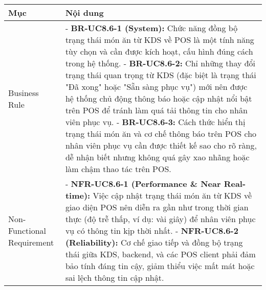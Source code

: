 \begin{longtable}{|m{4cm}|p{11cm}|}
\hline
\textbf{Mục} & \textbf{Nội dung} \\
\hline
Business Rule & - \textbf{BR-UC8.6-1 (System):} Chức năng đồng bộ trạng thái món ăn từ KDS về POS là một tính năng tùy chọn và cần được kích hoạt, cấu hình đúng cách trong hệ thống. \newline - \textbf{BR-UC8.6-2:} Chỉ những thay đổi trạng thái quan trọng từ KDS (đặc biệt là trạng thái "Đã xong" hoặc "Sẵn sàng phục vụ") mới nên được hệ thống chủ động thông báo hoặc cập nhật nổi bật trên POS để tránh làm quá tải thông tin cho nhân viên phục vụ. \newline - \textbf{BR-UC8.6-3:} Cách thức hiển thị trạng thái món ăn và cơ chế thông báo trên POS cho nhân viên phục vụ cần được thiết kế sao cho rõ ràng, dễ nhận biết nhưng không quá gây xao nhãng hoặc làm chậm thao tác trên POS. \\
\hline
Non-Functional Requirement & - \textbf{NFR-UC8.6-1 (Performance \& Near Real-time):} Việc cập nhật trạng thái món ăn từ KDS về giao diện POS nên diễn ra gần như trong thời gian thực (độ trễ thấp, ví dụ: vài giây) để nhân viên phục vụ có thông tin kịp thời nhất. \newline - \textbf{NFR-UC8.6-2 (Reliability):} Cơ chế giao tiếp và đồng bộ trạng thái giữa KDS, backend, và các POS client phải đảm bảo tính đáng tin cậy, giảm thiểu việc mất mát hoặc sai lệch thông tin cập nhật. \\
\hline
\end{longtable}

